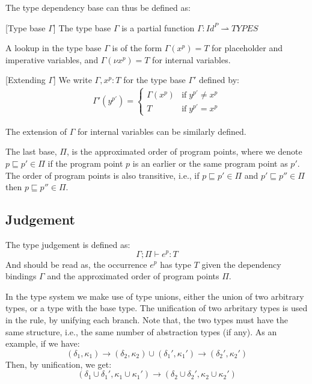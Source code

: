 \documentclass[../../master.tex]{subfiles}
\begin{document}
The type dependency base can thus be defined as:
\begin{definition}{[Type base $\Gamma$]}
	The type base $\Gamma$ is a partial function $\Gamma:Id^P\rightharpoonup TYPES$
\end{definition}

A lookup in the type base $\Gamma$ is of the form $\Gamma(x^p)=T$ for placeholder and imperative variables, and $\Gamma(\nu x^p)=T$ for internal variables.

\begin{definition}{[Extending $\Gamma$]}
	We write $\Gamma,x^p:T$ for the type base $\Gamma'$ defined by:
	\begin{align*}
		\Gamma'(y^{p'})=
		\left\{\begin{matrix}
			\Gamma(x^p) & \mbox{if}\;y^{p'} \neq x^{p}\\ 
			T & \mbox{if}\;y^{p'} = x^{p}
		\end{matrix}\right.
	\end{align*}
\end{definition}
The extension of $\Gamma$ for internal variables can be similarly defined.
\bigskip

The last base, $\Pi$, is the approximated order of program points, where we denote $p\sqsubseteq p'\in\Pi$ if the program point $p$ is an earlier or the same program point as $p'$.
The order of program points is also transitive, i.e., if $p\sqsubseteq p'\in\Pi$ and $p'\sqsubseteq p''\in\Pi$ then $p\sqsubseteq p''\in\Pi$.


\subsection{Judgement}
The type judgement is defined as:
$$\Gamma;\Pi\vdash e^p: T$$
And should be read as, the occurrence $e^p$ has type $T$ given the dependency bindings $\Gamma$ and the approximated order of program points $\Pi$.

In the type system we make use of type unions, either the union of two arbitrary types, or a type with the base type.
The unification of two arbritary types is used in the  rule, by unifying each branch.
Note that, the two types must have the same structure, i.e., the same number of abstraction types (if any).
As an example, if we have:
$$(\delta_1,\kappa_1)\rightarrow(\delta_2,\kappa_2)\cup(\delta_1',\kappa_1')\rightarrow(\delta_2',\kappa_2')$$
Then, by unification, we get:
$$(\delta_1\cup\delta_1',\kappa_1\cup\kappa_1')\rightarrow(\delta_2\cup\delta_2',\kappa_2\cup\kappa_2')$$
\end{document}
